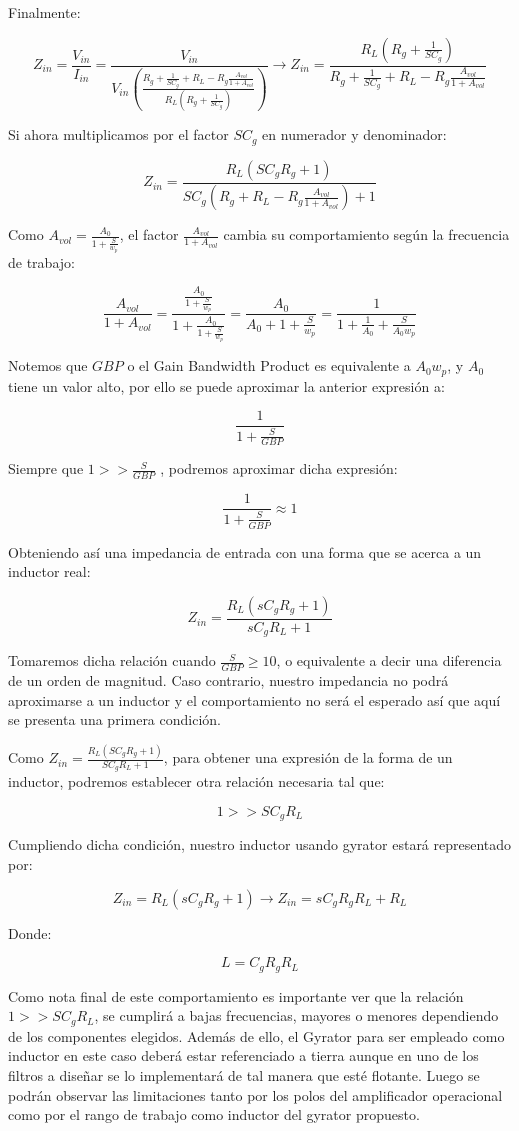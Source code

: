 Finalmente:

$$Z_{in}=\frac{V_{in}}{I_{in}}=\frac{V_{in}}{V_{in}(\frac{R_g+\frac{1}{SC_g}+R_L-R_g\frac{A_{vol}}{1+A_{vol}}}{R_L(R_g+\frac{1}{SC_g})})} \longrightarrow
Z_{in}=\frac{R_L(R_g+\frac{1}{SC_g})}{R_g+\frac{1}{SC_g}+R_L-R_g\frac{A_{vol}}{1+A_{vol}}}$$

Si ahora multiplicamos por el factor $SC_g$ en numerador y denominador:

$$Z_{in}=\frac{R_L(SC_gR_g+1)}{SC_g(R_g+R_L-R_g\frac{A_{vol}}{1+A_{vol}})+1}$$

Como $A_{vol}=\frac{A_0}{1+\frac{S}{w_p}}$, el factor $\frac{A_{vol}}{1+A_{vol}}$ cambia su comportamiento
según la frecuencia de trabajo:

$$\frac{A_{vol}}{1+A_{vol}}=\frac{\frac{A_0}{1+\frac{S}{w_p}}}{1+\frac{A_0}{1+\frac{S}{w_p}}}=
\frac{A_0}{A_0+1+\frac{S}{w_p}}=\frac{1}{1+\frac{1}{A_0}+\frac{S}{A_0w_p}}$$

Notemos que $GBP$ o el Gain Bandwidth Product es equivalente a $A_0w_p$, y $A_0$ tiene un valor alto, por ello se puede aproximar la anterior
expresión a:

$$\frac{1}{1+\frac{S}{GBP}}$$

Siempre que $1 >> \frac{S}{GBP}$ , podremos aproximar dicha expresión:

$$\frac{1}{1+\frac{S}{GBP}} \approx 1$$

Obteniendo así una impedancia de entrada con una forma que se acerca a un inductor real:

$$Z_{in}=\frac{R_L(sC_gR_g+1)}{sC_gR_L+1}$$

Tomaremos dicha relación cuando $\frac{S}{GBP} \geq 10$, o equivalente a decir una diferencia de un orden de magnitud.
Caso contrario, nuestro impedancia no podrá aproximarse a un inductor y el comportamiento no será el esperado así que aquí se presenta 
una primera condición.

Como $Z_{in}=\frac{R_L(SC_gR_g+1)}{SC_gR_L+1}$, para obtener una expresión de la forma de un inductor,
podremos establecer otra relación necesaria tal que:

$$1 >> SC_gR_L$$

Cumpliendo dicha condición, nuestro inductor usando gyrator estará representado por:

$$Z_{in}=R_L(sC_gR_g+1)\longrightarrow Z_{in}=sC_gR_gR_L+R_L$$

Donde:

$$L=C_gR_gR_L$$

Como nota final de este comportamiento es importante ver que la relación $1 >> SC_gR_L$, se cumplirá a bajas frecuencias,
mayores o menores dependiendo de los componentes elegidos. Además de ello, el Gyrator para ser empleado como inductor en este caso deberá estar
referenciado a tierra aunque en uno de los filtros a diseñar se lo implementará de tal manera que esté flotante. Luego se podrán observar las limitaciones
tanto por los polos del amplificador operacional como por el rango de trabajo como inductor del gyrator propuesto. 


